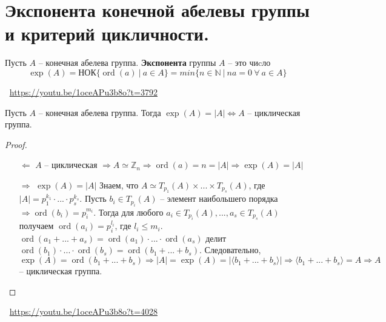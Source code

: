 \section{Экспонента конечной абелевы группы и критерий цикличности.}
\begin{definition}
    Пусть $A$ -- конечная абелева группа. \textbf{Экспонента} группы $A$ -- это чиcло
    \[
        \exp(A) = \text{НОК}\{ \operatorname{ord}(a) \> | \> a \in A \} = min\{ n \in \mathbb{N} \> | \> na = 0 \> \forall \> a \in A \}
    \]
\end{definition}
\large \faYoutube \normalsize $\>$ \url{https://youtu.be/1oceAPu3b8o?t=3792}
\begin{statement}
    Пусть $A$ -- конечная абелева группа. Тогда $\exp(A) = |A| \Leftrightarrow A$ -- циклическая группа.
    \begin{proof}
        \begin{enumerate}
            \item[$\Leftarrow$] $A$ -- циклическая $\Rightarrow A \simeq \mathbb{Z}_n \Rightarrow \operatorname{ord}(a) = n = |A| \Rightarrow \exp(A) = |A|$ 
            \item[$\Rightarrow$] $\exp(A) = |A|$ Знаем, что $A \simeq T_{p_1}(A) \times ... \times T_{p_s}(A)$, где $|A| = p_1^{k_1} \cdot ... \cdot p_s^{k_s}$. Пусть $b_i \in T_{p_i}(A)$ -- элемент наибольшего порядка $\Rightarrow \operatorname{ord}(b_i) = p_i^{m_i}$. Тогда для любого $a_i \in T_{p_i}(A), ..., a_s \in T_{p_s}(A)$ получаем $\operatorname{ord}(a_i) = p_i^{l_i}$, где $l_i \leqslant m_i$. $\operatorname{ord}(a_1 + ... + a_s) = \operatorname{ord}(a_1) \cdot ... \cdot \operatorname{ord}(a_s)$ делит $\operatorname{ord}(b_1) \cdot ... \cdot \operatorname{ord}(b_s) = \operatorname{ord}(b_1 + ... + b_s)$. Следовательно, $\exp(A) = \operatorname{ord}(b_1 + ... + b_s) \Rightarrow |A| = \exp(A) = |\langle b_1 + ... + b_s \rangle| \Rightarrow \langle b_1 + ... + b_s \rangle = A \Rightarrow A$ -- циклическая группа.
        \end{enumerate}
    \end{proof}
\end{statement}
\large \faYoutube \normalsize $\>$ \url{https://youtu.be/1oceAPu3b8o?t=4028}